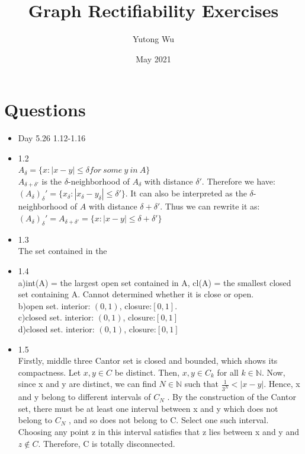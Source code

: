 \documentclass{article}
\title{Graph Rectifiability Exercises}
\author{Yutong Wu}
\date{May 2021}
\begin{document}
\maketitle

\section{Questions}
\begin{itemize}
    \item Day 5.26 1.12-1.16\\
    \item 1.2\\
$A_{\delta} = \{x : |x - y| \leq \delta for \ some \ y \ in \ A\}$\\
$A_{\delta + \delta'}$ is the $\delta$-neighborhood of $A_\delta$ with distance $\delta'$. Therefore we have:
$(A_\delta)_\delta' = \{x_\delta : |x_\delta - y_\delta| \leq \delta'\}$. It can also be interpreted as the  $\delta$-neighborhood of $A$ with distance $\delta + \delta'$. Thus we can rewrite it as: $(A_\delta)_\delta'= A_{\delta + \delta'} = \{x : |x - y| \leq \delta + \delta'\}$\\

\item 1.3\\
The set contained in the\\

\item 1.4\\
a)int(A) = the largest open set contained in A, cl(A) = the smallest closed set containing A. Cannot determined whether it is close or open.\\
b)open set. interior: $(0,1)$, closure:$[0,1]$.\\
c)closed set. interior: $(0,1)$, closure:$[0,1]$\\
d)closed set. interior: $(0,1)$, closure:$[0,1]$\\

\item 1.5\\
Firstly, middle three Cantor set is closed and bounded, which shows its compactness. Let $x, y \in C$ be distinct. Then, $x, y \in C_k$ for all $k \in \mathbb{N}$. Now, since x and y are distinct, we can find $N \in \mathbb{N}$ such that $\frac{1}{3^N} < |x - y|$. Hence, x and y belong to different intervals of $C_N$ . By the construction of the Cantor set, there must be at least one interval between x and y which does not belong to $C_N$ , and so does not belong to C. Select one such interval. Choosing any point z in this interval satisfies that z lies between x and y and $z \notin C$. Therefore, C is totally disconnected.


\end{itemize}
\end{document}

